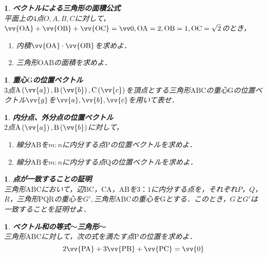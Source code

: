 \documentclass[10pt,
fleqn,
dvipdfmx,
uplatex
]{jsarticle}
\newtheorem{question}[Question]{}
\begin{document}
\begin{question}{\bf\boldmath ベクトルによる三角形の面積公式}\\
平面上の$4$点$O,A,B,C$に対して，$\vv {\text{OA}}+\vv {\text{OB}}+\vv {\text{OC}}=\vv 0, \text{OA}=2, \text{OB}=1, \text{OC}=\sqrt 2$のとき，
\begin{enumerate}
\item 内積$\vv {\text{OA}}\cdot \vv {\text{OB}}$を求めよ．
\item 三角形$\text{OAB}$の面積を求めよ．
\end{enumerate}

\end{question}



\begin{question}{\bf\boldmath 重心$\text{G}$の位置ベクトル}\\
$3$点$\text{A}\left(\vv {a}\right), \text{B}\left(\vv {b}\right), \text{C}\left(\vv {c}\right)$を頂点とする三角形$\text{ABC}$の重心$\text{G}$の位置ベクトル$\vv {g}$を$\vv {a}, \vv {b}, \vv {c}$を用いて表せ．
\end{question}



\begin{question}{\bf\boldmath 内分点、外分点の位置ベクトル}\\
$2$点$\text{A}\left(\vv {a}\right), \text{B}\left(\vv {b}\right)$に対して，
\begin{enumerate}
\item 線分$\text{AB}$を$m:n$に内分する点$\text{P}$の位置ベクトルを求めよ．
\item 線分$\text{AB}$を$m:n$に内分する点$\text{Q}$の位置ベクトルを求めよ．
\end{enumerate}

\end{question}



\begin{question}{\bf\boldmath 点が一致することの証明}\\
三角形$\text{ABC}$において，辺$\text{BC}$，$\text{CA}$，$\text{AB}$を$3：1$に内分する点を，それぞれ$P$，$Q$，$R$，三角形$\text{PQR}$の重心を$G',$三角形$\text{ABC}$の重心を$\text{G}$とする．このとき，$G$と$G'$は一致することを証明せよ．
\end{question}



\begin{question}{\bf\boldmath ベクトル和の等式$〜$三角形$〜$}\\
三角形$\text{ABC}$に対して，次の式を満たす点$\text{P}$の位置を求めよ．
\[2\vv {\text{PA}}+3\vv {\text{PB}}+\vv {\text{PC}}=\vv {0}\]
\end{question}
\end{document}
